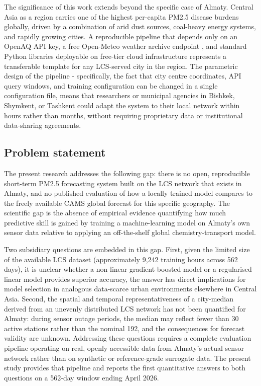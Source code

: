 The significance of this work extends beyond the specific case of Almaty. Central Asia as a region carries one of the highest per-capita PM2.5 disease burdens globally, driven by a combination of arid dust sources, coal-heavy energy systems, and rapidly growing cities. A reproducible pipeline that depends only on an OpenAQ API key, a free Open-Meteo weather archive endpoint \cite{zippenfenig_openmeteo_2023}, and standard Python libraries deployable on free-tier cloud infrastructure represents a transferable template for any LCS-served city in the region. The parametric design of the pipeline - specifically, the fact that city centre coordinates, API query windows, and training configuration can be changed in a single configuration file, means that researchers or municipal agencies in Bishkek, Shymkent, or Tashkent could adapt the system to their local network within hours rather than months, without requiring proprietary data or institutional data-sharing agreements.

\subsection{Problem statement}\label{problem-statement}

The present research addresses the following gap: there is no open, reproducible short-term PM2.5 forecasting system built on the LCS network that exists in Almaty, and no published evaluation of how a locally trained model compares to the freely available CAMS global forecast for this specific geography. The scientific gap is the absence of empirical evidence quantifying how much predictive skill is gained by training a machine-learning model on Almaty's own sensor data relative to applying an off-the-shelf global chemistry-transport model.

Two subsidiary questions are embedded in this gap. First, given the limited size of the available LCS dataset (approximately 9,242 training hours across 562 days), it is unclear whether a non-linear gradient-boosted model or a regularised linear model provides superior accuracy, the answer has direct implications for model selection in analogous data-scarce urban environments elsewhere in Central Asia. Second, the spatial and temporal representativeness of a city-median derived from an unevenly distributed LCS network has not been quantified for Almaty: during sensor outage periods, the median may reflect fewer than 30 active stations rather than the nominal 192, and the consequences for forecast validity are unknown. Addressing these questions requires a complete evaluation pipeline operating on real, openly accessible data from Almaty's actual sensor network rather than on synthetic or reference-grade surrogate data. The present study provides that pipeline and reports the first quantitative answers to both questions on a 562-day window ending April 2026.

